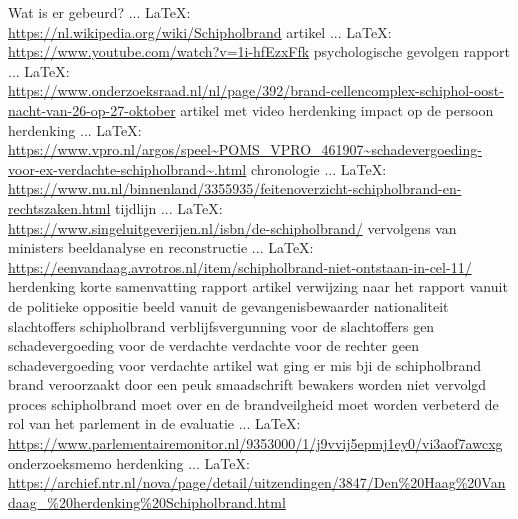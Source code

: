 \begin{thebibliography}{99}
{{{{{{{							Wat is er gebeurd?
							 ... \LaTeX:\\ \url{https://nl.wikipedia.org/wiki/Schipholbrand}
							artikel
							 ... \LaTeX:\\ \url{https://www.youtube.com/watch?v=1i-hfEzxFfk}
							psychologische gevolgen
							rapport
							 ... \LaTeX:\\ \url{https://www.onderzoeksraad.nl/nl/page/392/brand-cellencomplex-schiphol-oost-nacht-van-26-op-27-oktober}
							artikel met video
							herdenking
							impact op de persoon
							herdenking
							 ... \LaTeX:\\ \url{https://www.vpro.nl/argos/speel~POMS_VPRO_461907~schadevergoeding-voor-ex-verdachte-schipholbrand~.html}
							chronologie
							 ... \LaTeX:\\ \url{https://www.nu.nl/binnenland/3355935/feitenoverzicht-schipholbrand-en-rechtszaken.html}
							tijdlijn
							 ... \LaTeX:\\ \url{https://www.singeluitgeverijen.nl/isbn/de-schipholbrand/}
							vervolgens van ministers
							beeldanalyse en reconstructie
							 ... \LaTeX:\\ \url{https://eenvandaag.avrotros.nl/item/schipholbrand-niet-ontstaan-in-cel-11/}
							herdenking
							korte samenvatting
							rapport
							artikel
							verwijzing naar het rapport vanuit de politieke oppositie
							beeld vanuit de gevangenisbewaarder
							nationaliteit slachtoffers schipholbrand
							verblijfsvergunning voor de slachtoffers
							gen schadevergoeding voor de verdachte
							verdachte voor de rechter
							geen schadevergoeding voor verdachte
							artikel wat ging er mis bji de schipholbrand
							brand veroorzaakt door een peuk
							smaadschrift
							bewakers worden niet vervolgd
							proces schipholbrand moet over en de brandveilgheid moet worden verbeterd
							de rol van het parlement in de evaluatie
							 ... \LaTeX:\\ \url{https://www.parlementairemonitor.nl/9353000/1/j9vvij5epmj1ey0/vi3aof7awcxg}
							onderzoeksmemo
							herdenking
							 ... \LaTeX:\\ \url{https://archief.ntr.nl/nova/page/detail/uitzendingen/3847/Den%20Haag%20Vandaag_%20herdenking%20Schipholbrand.html}
}}}}}}}
\end{thebibliography}
